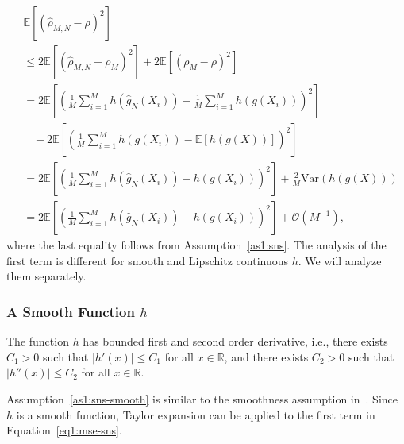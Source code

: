 \begin{align} \label{eq1:mse-sns}
    & \mathbb{E} \left[ \left( \hat{\rho}_{M, N} - \rho \right)^2 \right] \nonumber \\
    & \leq 2 \mathbb{E} \left[ \left( \hat{\rho}_{M, N} - \rho_M \right)^2 \right] 
            + 2  \mathbb{E} \left[ \left(\rho_M - \rho \right)^2 \right]  \nonumber \\
    & = 2 \mathbb{E} \left[  \left( \frac{1}{M} \sum_{i=1}^M h\left( \hat{g}_{N}(X_i) \right) -  \frac{1}{M} \sum_{i=1}^M h\left(g(X_i) \right)  \right)^2\right] \nonumber \\
    & ~~~~ + 2  \mathbb{E} \left[ \left(\frac{1}{M} \sum_{i=1}^M h\left(g(X_i) \right) - \mathbb{E}\left[ h(g(X))\right] \right)^2 \right]  \nonumber \\
    & = 2 \mathbb{E} \left[  \left( \frac{1}{M} \sum_{i=1}^M h\left( \hat{g}_{N}(X_i) \right) -  h\left(g(X_i) \right)  \right)^2\right] + \frac{2}{M} \text{Var}(h(g(X))) \nonumber \\
    & = 2 \mathbb{E} \left[  \left( \frac{1}{M} \sum_{i=1}^M h\left( \hat{g}_{N}(X_i) \right) -  h\left(g(X_i) \right)  \right)^2\right] + \mathcal{O}(M^{-1}),
\end{align}
where the last equality follows from Assumption~\ref{as1:sns}.
The analysis of the first term is different for smooth and Lipschitz continuous $h$. 
We will analyze them separately.

\subsubsection*{A Smooth Function $h$}
\begin{assumption} \label{as1:sns-smooth}
    The function $h$ has bounded first and second order derivative, i.e., there exists $C_1 > 0$ such that $|h'(x)| \leq C_1$ for all $x \in \mathbb{R}$, and there exists $C_2 > 0$ such that $|h''(x)| \leq C_2$ for all $x \in \mathbb{R}$.
\end{assumption}
Assumption~\ref{as1:sns-smooth} is similar to the smoothness assumption in~\cite{wang2022smooth}.
Since $h$ is a smooth function, Taylor expansion can be applied to the first term in Equation~\ref{eq1:mse-sns}.

